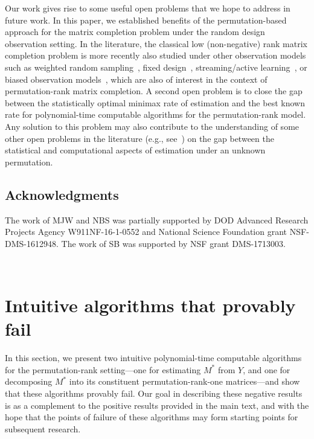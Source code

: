 \documentclass[11pt, hidelinks]{article} %
\newcommand{\wtmatrix}{M}
\newcommand{\wtstar}{\wtmatrix^*}
\newcommand{\obs}{\ensuremath{Y}}
\begin{document}
Our work gives rise to some useful open problems that we hope to
address in future work. In this paper, we established benefits of the
permutation-based approach for the matrix completion problem under the
random design observation setting. In the literature, the classical
low (non-negative) rank matrix completion problem is more recently also
studied under other observation models such as weighted random
sampling~\cite{negahban2012restricted}, fixed
design~\cite{jain2013low, klopp2014noisy}, streaming/active
learning~\cite{yun2015streaming, jin2016provable, balcan2016noise}, or
biased observation models~\cite{hsieh2015pu}, which are also of
interest in the context of permutation-rank matrix completion. A
second open problem is to close the gap between the statistically
optimal minimax rate of estimation 
and the best known rate 
for polynomial-time computable algorithms for the permutation-rank
model. Any solution to this problem may also contribute to the
understanding of some other open problems in the literature (e.g.,
see~\cite{shah2015stochastically,flammarion2016optimal,shah2016permutation})
on the gap between the statistical and computational aspects of
estimation under an unknown permutation.


\subsection*{Acknowledgments}

The work of MJW and NBS was partially supported by DOD Advanced
Research Projects Agency W911NF-16-1-0552 and National Science
Foundation grant NSF-DMS-1612948. The work of SB was supported by 
NSF grant DMS-1713003.


~\\
\appendix


\section{Intuitive algorithms that provably fail}
\label{SecAlgoFail}


In this section, we present two intuitive polynomial-time computable
algorithms for the permutation-rank setting---one for estimating
$\wtstar$ from $\obs$, and one for decomposing $\wtstar$ into its
constituent permutation-rank-one matrices---and show that these
algorithms provably fail.  Our goal in describing these negative
results is as a complement to the positive results provided in the
main text, and with the hope that the points of failure of these
algorithms may form starting points for subsequent research.
\end{document}
